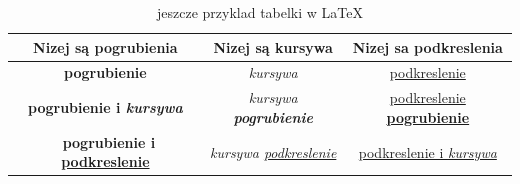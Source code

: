 \documentclass[12pt,a4paper,titlepage]{article}
\begin{document}
\begin{table}[h]
\centering
\begin{tabular}{ | c |  c |  c | }
\hline
Nizej są pogrubienia & Nizej są kursywa & Nizej sa podkreslenia \\
\hline
\textbf{pogrubienie} & \textit{kursywa} & \underline{podkreslenie} \\  
\textbf{pogrubienie i \textit{kursywa}} & \textit{kursywa \textbf{pogrubienie}} & \underline{podkreslenie \textbf{pogrubienie}} \\ \ 
\textbf{pogrubienie i \underline{podkreslenie}} & \textit{kursywa \underline{podkreslenie}} & \underline{podkreslenie i \textit{kursywa}} \\ 
\hline
\end{tabular}
\caption{jeszcze przyklad tabelki w \LaTeX{}}
\label{tab:tabelkaa}
\end{table}
\end{document}
